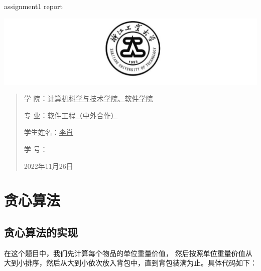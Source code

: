 \documentclass[UTF8]{ctexart}
\date{}
\begin{document}
\begin{center}
    \quad \\
    \quad \\
    \huge  assignment1 report
\end{center}
\vskip 3.5cm

\begin{center}
    \includegraphics[scale=0.6]{../img/logo.png}
\end{center}
\vskip 4.5cm

\begin{quotation}
    \songti \fontsize{15}{15}
    \doublespacing
    \par\setlength\parindent{6.5em}
    \quad

    学\hspace{0.61cm} 院：\underline{\quad 计算机科学与技术学院、软件学院}

    专\hspace{0.61cm} 业：\underline{\qquad 软件工程（中外合作）\qquad\qquad  }

    学生姓名：\underline{\qquad\qquad\qquad 李肖 \qquad\qquad\qquad\qquad }

    学\hspace{0.61cm} 号：\underline{\qquad{} \qquad\qquad\qquad}

    \vskip 1cm
    \centering
    2022年11月26日
\end{quotation}

\newpage
\section{贪心算法}
\subsection{贪心算法的实现}
在这个题目中，我们先计算每个物品的单位重量价值，
然后按照单位重量价值从大到小排序，然后从大到小依次放入背包中，直到背包装满为止。具体代码如下：
\end{document}
